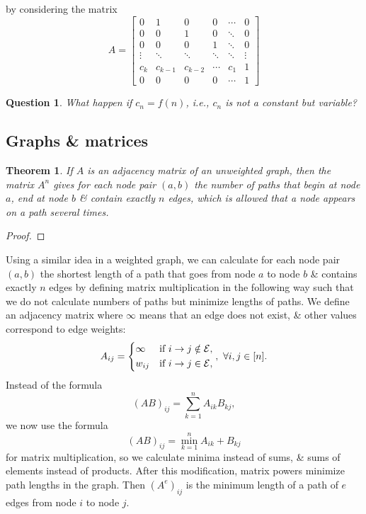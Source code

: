 \documentclass{article}
\newtheorem{question}{Question}
\newtheorem{theorem}{Theorem}
\begin{document}
by considering the matrix
\begin{equation*}
    A = \begin{bmatrix}
        0 & 1 & 0 & 0 & \cdots & 0\\0 & 0 & 1 & 0 & \ddots & 0\\ 0 & 0 & 0 & 1 & \ddots & 0\\\vdots & \ddots & \ddots & \ddots & \ddots & \vdots\\c_k & c_{k - 1} & c_{k - 2} & \cdots & c_1 & 1\\0 & 0 & 0 & 0 & \cdots & 1
    \end{bmatrix}
\end{equation*}

\begin{question}
    What happen if $c_n = f(n)$, i.e., $c_n$ is not a constant but variable?
\end{question}


\subsection{Graphs \& matrices}

\begin{theorem}
    If $A$ is an adjacency matrix of an unweighted graph, then the matrix $A^n$ gives for each node pair $(a,b)$ the number of paths that begin at node $a$, end at node $b$ \& contain exactly $n$ edges, which is allowed that a node appears on a path several times.
\end{theorem}

\begin{proof}

\end{proof}
Using a similar idea in a weighted graph, we can calculate for each node pair $(a,b)$ the shortest length of a path that goes from node $a$ to node $b$ \& contains exactly $n$ edges by defining matrix multiplication in the following way such that we do not calculate numbers of paths but minimize lengths of paths. We define an adjacency matrix where $\infty$ means that an edge does not exist, \& other values correspond to edge weights:
\begin{equation*}
    A_{ij} = \left\{\begin{split}
        &\infty&&\mbox{if }i\to j\notin{\cal E},\\
        &w_{ij}&&\mbox{if }i\to j\in{\cal E},
    \end{split}\right.,\ \forall i,j\in[n].
\end{equation*}
Instead of the formula
\begin{equation*}
    (AB)_{ij} = \sum_{k=1}^n A_{ik}B_{kj},
\end{equation*}
we now use the formula
\begin{equation*}
    (AB)_{ij} = \min_{k=1}^n A_{ik} + B_{kj}
\end{equation*}
for matrix multiplication, so we calculate minima instead of sums, \& sums of elements instead of products. After this modification, matrix powers minimize path lengths in the graph. Then $(A^e)_{ij}$ is the minimum length of a path of $e$ edges from node $i$ to node $j$.
\end{document}
